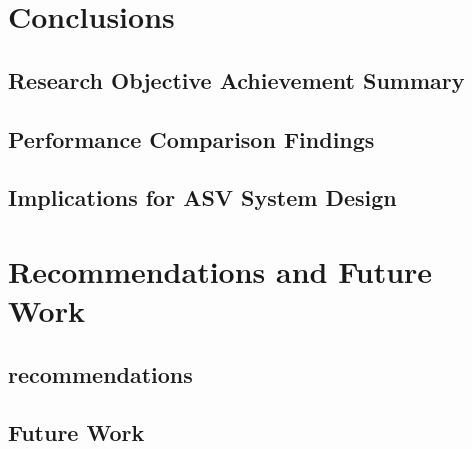\documentclass{erauthesis}
\begin{document}

\chapter{Conclusions} 


\section{Research Objective Achievement Summary}

\section{Performance Comparison Findings}

\section{Implications for ASV System Design}

\chapter{Recommendations and Future Work} 

\section{recommendations} \label{reccomendations}

\section{Future Work} \label{futurework}
\end{document}
